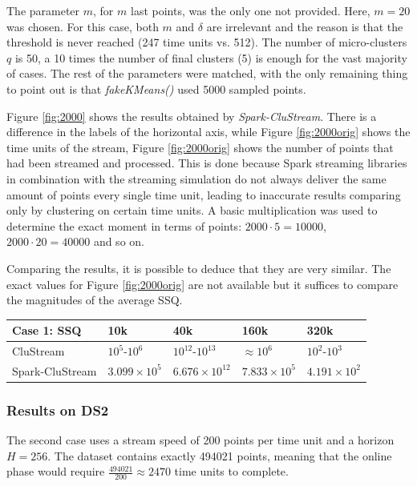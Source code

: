 The parameter $m$, for $m$ last points, was the only one not provided. Here, $m=20$ was chosen. For this case, both $m$ and $\delta$ are irrelevant and the reason is that the threshold is never reached (247 time units vs. 512). The number of micro-clusters $q$ is 50, a 10 times the number of final clusters (5) is enough for the vast majority of cases\cite{clustreamOrig}. The rest of the parameters were matched, with the only remaining thing to point out is that \textit{fakeKMeans()} used 5000 sampled points.

Figure \ref{fig:2000} shows the results obtained by \textit{Spark-CluStream}. There is a difference in the labels of the horizontal axis, while Figure \ref{fig:2000orig} shows the time units of the stream, Figure \ref{fig:2000orig} shows the number of points that had been streamed and processed. This is done because Spark streaming libraries in combination with the streaming simulation do not always deliver the same amount of points every single time unit, leading to inaccurate results comparing only by clustering on certain time units. A basic multiplication was used to determine the exact moment in terms of points: $2000\cdot 5 = 10000$, $2000\cdot 20 = 40000$ and so on.

Comparing the results, it is possible to deduce that they are very similar. The exact values for Figure \ref{fig:2000orig} are not available but it suffices to compare the magnitudes of the average SSQ. 

\begin{center}
\begin{tabular}{|l|l|l|l|l|}\hline
\textbf{Case 1: SSQ} & \textbf{10k} & \textbf{40k} & \textbf{160k} & \textbf{320k}\\\hline
CluStream & $10^5$-$10^6$ & $10^{12}$-$10^{13}$ & $\approx 10^6$ & $10^2$-$10^3$\\\hline
Spark-CluStream & $3.099\times10^5$ & $6.676\times10^{12}$ & $7.833\times10^5$ & $4.191\times10^2$\\\hline
\end{tabular}
\end{center}




\subsubsection{Results on DS2}

The second case uses a stream speed of 200 points per time unit and a horizon $H=256$. The dataset contains exactly 494021 points, meaning that the online phase would require $\frac{494021}{200} \approx 2470$ time units to complete.

